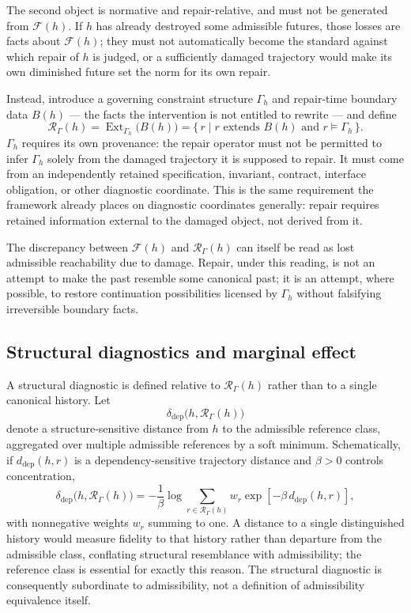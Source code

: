 \documentclass[11pt]{article}
\begin{document}
The second object is normative and repair-relative, and must not be
generated from $\mathcal{F}(h)$. If $h$ has already destroyed some
admissible futures, those losses are facts about $\mathcal{F}(h)$; they
must not automatically become the standard against which repair of $h$
is judged, or a sufficiently damaged trajectory would make its own
diminished future set the norm for its own repair.

Instead, introduce a governing constraint structure $\Gamma_h$ and
repair-time boundary data $B(h)$ --- the facts the intervention is not
entitled to rewrite --- and define
\[
	\mathcal{R}_\Gamma(h)
	=
	\operatorname{Ext}_{\Gamma_h}\!\bigl(B(h)\bigr)
	=
	\{\, r \mid r \text{ extends } B(h) \text{ and } r \models \Gamma_h \,\}.
\]
$\Gamma_h$ requires its own provenance: the repair operator must not be
permitted to infer $\Gamma_h$ solely from the damaged trajectory it is
supposed to repair. It must come from an independently retained
specification, invariant, contract, interface obligation, or other
diagnostic coordinate. This is the same requirement the framework already
places on diagnostic coordinates generally: repair requires retained
information external to the damaged object, not derived from it.

The discrepancy between $\mathcal{F}(h)$ and $\mathcal{R}_\Gamma(h)$ can
itself be read as lost admissible reachability due to damage. Repair,
under this reading, is not an attempt to make the past resemble some
canonical past; it is an attempt, where possible, to restore continuation
possibilities licensed by $\Gamma_h$ without falsifying irreversible
boundary facts.

\subsection{Structural diagnostics and marginal effect}

A structural diagnostic is defined relative to $\mathcal{R}_\Gamma(h)$
rather than to a single canonical history. Let
\[
	\delta_{\mathrm{dep}}\bigl(h, \mathcal{R}_\Gamma(h)\bigr)
\]
denote a structure-sensitive distance from $h$ to the admissible
reference class, aggregated over multiple admissible references by a
soft minimum. Schematically, if $d_{\mathrm{dep}}(h,r)$ is a
dependency-sensitive trajectory distance and $\beta > 0$ controls
concentration,
\[
	\delta_{\mathrm{dep}}\bigl(h, \mathcal{R}_\Gamma(h)\bigr)
	=
	-\frac{1}{\beta}
	\log
	\sum_{r \in \mathcal{R}_\Gamma(h)}
	w_r \exp\!\left[-\beta\, d_{\mathrm{dep}}(h,r)\right],
\]
with nonnegative weights $w_r$ summing to one. A distance to a single
distinguished history would measure fidelity to that history rather than
departure from the admissible class, conflating structural resemblance
with admissibility; the reference class is essential for exactly this
reason. The structural diagnostic is consequently subordinate to
admissibility, not a definition of admissibility equivalence itself.
\end{document}
